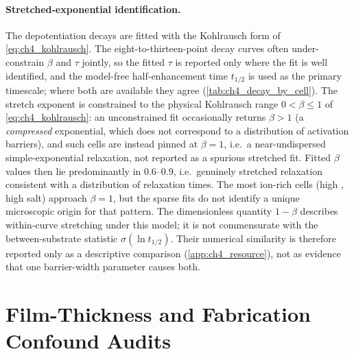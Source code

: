 \paragraph{Stretched-exponential identification.} The depotentiation decays are
fitted with the Kohlrausch form of \cref{eq:ch4_kohlrausch}. The
eight-to-thirteen-point decay curves often under-constrain \(\beta\) and \(\tau\)
jointly, so the fitted \(\tau\) is reported only where the fit is well identified,
and the model-free half-enhancement time \(t_{1/2}\) is used as the primary
timescale; where both are available they agree (\cref{tab:ch4_decay_by_cell}).
The stretch exponent is constrained to the physical Kohlrausch range
\(0<\beta\le1\) of \cref{eq:ch4_kohlrausch}: an unconstrained fit occasionally
returns \(\beta>1\) (a \emph{compressed} exponential, which does not correspond
to a distribution of activation barriers), and such cells are instead pinned at
\(\beta=1\), i.e.\ a near-undispersed simple-exponential relaxation, not
reported as a spurious stretched fit. Fitted \(\beta\) values then lie
predominantly in \numrange{0.6}{0.9}, i.e.\ genuinely stretched relaxation
consistent with a distribution of relaxation times. The most ion-rich cells
(high \PEO{}, high salt) approach \(\beta=1\), but the sparse fits do not identify
a unique microscopic origin for that pattern. The dimensionless quantity
\(1-\beta\) describes within-curve stretching under this model; it is not
commensurate with the between-substrate statistic \(\sigma(\ln t_{1/2})\).
Their numerical similarity is therefore reported only as a descriptive
comparison (\cref{app:ch4_resource}), not as evidence that one barrier-width
parameter causes both.

\section{Film-Thickness and Fabrication Confound Audits}\label{app:ch4_confounds}

